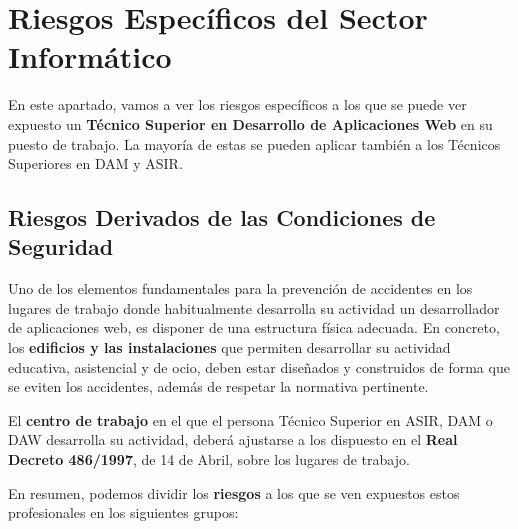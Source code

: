 \section{Riesgos Específicos del Sector Informático}
En este apartado, vamos a ver los riesgos específicos a los que se puede ver expuesto un \textbf{Técnico Superior en Desarrollo de Aplicaciones Web} en su puesto de trabajo. La mayoría de estas se pueden aplicar también a los Técnicos Superiores en DAM y ASIR.

\subsection{Riesgos Derivados de las Condiciones de Seguridad}
Uno de los elementos fundamentales para la prevención de accidentes en los lugares de trabajo donde habitualmente desarrolla su actividad un desarrollador de aplicaciones web, es disponer de una estructura física adecuada. En concreto, los \textbf{edificios y las instalaciones} que permiten desarrollar su actividad educativa, asistencial y de ocio, deben estar diseñados y construidos de forma que se eviten los accidentes, además de respetar la normativa pertinente.

El \textbf{centro de trabajo} en el que el persona Técnico Superior en ASIR, DAM o DAW desarrolla su actividad, deberá ajustarse a los dispuesto en el \textbf{Real Decreto 486/1997}, de 14 de Abril, sobre los lugares de trabajo.

En resumen, podemos dividir los \textbf{riesgos} a los que se ven expuestos estos profesionales en los siguientes grupos:

